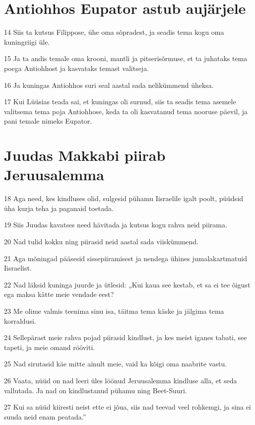 \section*{Antiohhos Eupator astub aujärjele}

\par 14 Siis ta kutsus Filippose, ühe oma sõpradest, ja seadis tema kogu oma kuningriigi üle.
\par 15 Ja ta andis temale oma krooni, mantli ja pitserisõrmuse, et ta juhataks tema poega Antiohhost ja kasvataks temast valitseja.
\par 16 Ja kuningas Antiohhos suri seal aastal sada nelikümmend üheksa.
\par 17 Kui Lüüsias teada sai, et kuningas oli surnud, siis ta seadis tema asemele valitsema tema poja Antiohhose, keda ta oli kasvatanud tema nooruse päevil, ja pani temale nimeks Eupator. 

\section*{Juudas Makkabi piirab Jeruusalemma}

\par 18 Aga need, kes kindluses olid, sulgesid pühamu Iisraelile igalt poolt, püüdsid üha kurja teha ja paganaid toetada.
\par 19 Siis Juudas kavatses need hävitada ja kutsus kogu rahva neid piirama.
\par 20 Nad tulid kokku ning piirasid neid aastal sada viiskümmend.
\par 21 Aga mõningad pääsesid sissepiiramisest ja nendega ühines jumalakartmatuid Iisraelist.
\par 22 Nad läksid kuninga juurde ja ütlesid: „Kui kaua see kestab, et sa ei tee õigust ega maksa kätte meie vendade eest?
\par 23 Me olime valmis teenima sinu isa, täitma tema käske ja jälgima tema korraldusi.
\par 24 Sellepärast meie rahva pojad piirasid kindlust, ja kes meist iganes tabati, see tapeti, ja meie omand rööviti.
\par 25 Nad sirutasid käe mitte ainult meie, vaid ka kõigi oma naabrite vastu.
\par 26 Vaata, nüüd on nad leeri üles löönud Jeruusalemma kindluse alla, et seda vallutada. Ja nad on kindlustanud pühamu ning Beet-Suuri.
\par 27 Kui sa nüüd kiiresti neist ette ei jõua, siis nad teevad veel rohkemgi, ja sina ei suuda neid enam peatada.” 


